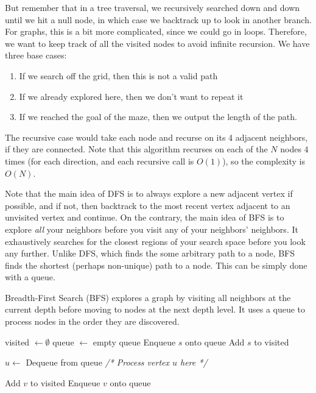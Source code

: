 \begin{example}
    But remember that in a tree traversal, we recursively searched down and down until we hit a null node, in which case we backtrack up to look in another branch. For graphs, this is a bit more complicated, since we could go in loops. Therefore, we want to keep track of all the visited nodes to avoid infinite recursion. We have three base cases: 
    \begin{enumerate}
      \item If we search off the grid, then this is not a valid path 
      \item If we already explored here, then we don't want to repeat it 
      \item If we reached the goal of the maze, then we output the length of the path. 
    \end{enumerate}
    The recursive case would take each node and recurse on its 4 adjacent neighbors, if they are connected. Note that this algorithm recurses on each of the $N$ nodes $4$ times (for each direction, and each recursive call is $O(1)$), so the complexity is $O(N)$. 
  \end{example}

  Note that the main idea of DFS is to always explore a new adjacent vertex if possible, and if not, then backtrack to the most recent vertex adjacent to an unvisited vertex and continue. On the contrary, the main idea of BFS is to explore \textit{all} your neighbors before you visit any of your neighbors' neighbors. It exhaustively searches for the closest regions of your search space before you look any further. Unlike DFS, which finds the some arbitrary path to a node, BFS finds the shortest (perhaps non-unique) path to a node. This can be simply done with a queue. 

  \begin{algo}
    Breadth-First Search (BFS) explores a graph by visiting all neighbors at the current depth before moving to nodes at the next depth level. It uses a queue to process nodes in the order they are discovered.
    \begin{algorithm}[H]
      \label{alg:bfs}
      \begin{algorithmic}[1]
        
          \State visited $\gets \emptyset$ 
          \State queue $\gets$ empty queue
          \State Enqueue $s$ onto queue
          \State Add $s$ to visited
          
            \State $u \gets$ Dequeue from queue 
            \State \textit{/* Process vertex $u$ here */}
            
                \State Add $v$ to visited
                \State Enqueue $v$ onto queue
              \EndIf
            \EndFor
          \EndWhile
        \EndFunction
      \end{algorithmic}
    \end{algorithm}
  \end{algo}

